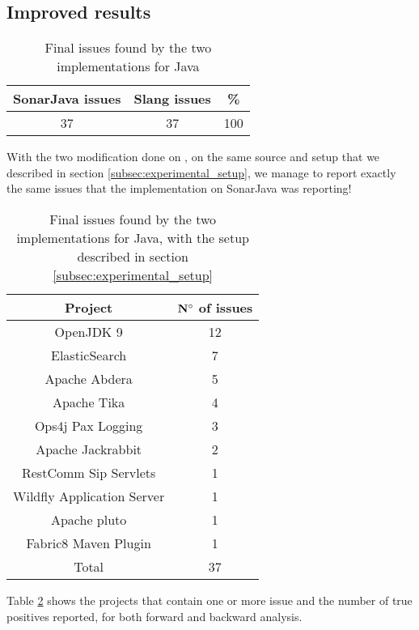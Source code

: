 \subsection{Improved results}
\label{subsec:improved_results}

\begin{table}[h]
	\centering
	\caption{Final issues found by the two implementations for Java}
	\label{table:final-sonarjava-vs-slang}
	\begin{tabular}{|c|c|c|}
		\hline
		\bf SonarJava issues & \bf Slang issues & \bf \% \\ \hline
		37 &  37 &  100 \\ \hline
	\end{tabular}
\end{table}

With the two modification done on \slang{}, on the same source and setup that we described in section \ref{subsec:experimental_setup}, we manage to report exactly the same issues that the implementation on SonarJava was reporting!

\begin{table}[h]
	\centering
	\caption{Final issues found by the two implementations for Java, with the setup described in section \ref{subsec:experimental_setup}}
	\label{table:issues-per-project}
	\begin{tabular}{|c|c|}
		\hline
		\bf Project & \bf $\bf N^{\circ}$  of issues\\ \hline
		OpenJDK 9 & 12 \\
		ElasticSearch & 7 \\
		Apache Abdera & 5 \\
		Apache Tika & 	4 \\
		Ops4j Pax Logging & 3 \\
		Apache Jackrabbit & 2 \\
		RestComm Sip Servlets & 1 \\
		Wildfly Application Server & 1 \\
		Apache pluto & 1 \\
		Fabric8 Maven Plugin & 1 \\\hline
		Total &  37 \\ \hline
	\end{tabular}
\end{table}


Table \ref{table:issues-per-project} shows the projects that contain one or more issue and the number of true positives reported, for both forward and backward analysis. 

